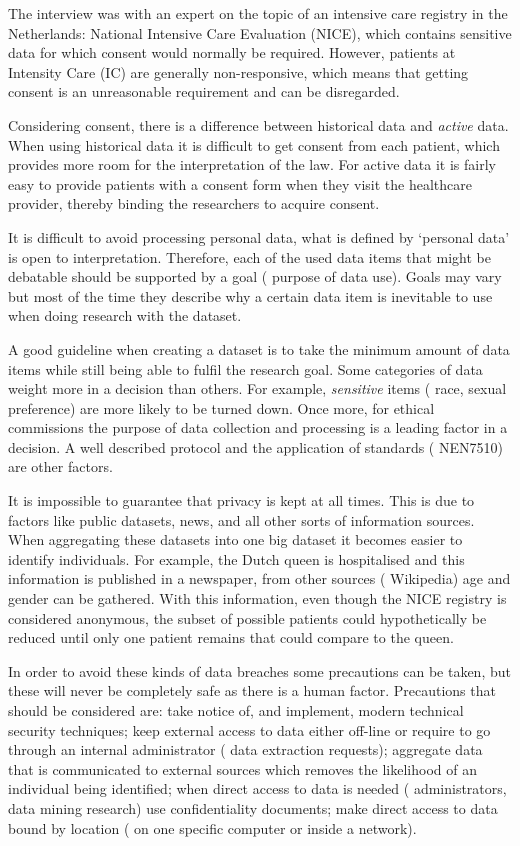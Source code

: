 The interview was with an expert on the topic of an intensive care registry in the Netherlands: National Intensive Care Evaluation (NICE), 
which contains sensitive data for which consent would normally be required. 
However, patients at Intensity Care (IC) are generally non-responsive, which means that getting consent is an unreasonable requirement and can be disregarded.

Considering consent, there is a difference between historical data and \emph{active} data.
When using historical data it is difficult to get consent from each patient, which provides more room for the interpretation of the law.
For active data it is fairly easy to provide patients with a consent form when they visit the healthcare provider, thereby binding the researchers to acquire consent. 

It is difficult to avoid processing personal data, \ie{} what is defined by `personal data' is open to interpretation.
Therefore, each of the used data items that might be debatable should be supported by a goal (\ie{} purpose of data use).
Goals may vary but most of the time they describe why a certain data item is inevitable to use when doing research with the dataset.

A good guideline when creating a dataset is to take the minimum amount of data items while still being able to fulfil the research goal.
Some categories of data weight more in a decision than others.
For example, \emph{sensitive} items (\eg{} race, sexual preference) are more likely to be turned down.
Once more, for ethical commissions the purpose of data collection and processing is a leading factor in a decision. 
A well described protocol and the application of standards (\eg{} NEN7510) are other factors.

It is impossible to guarantee that privacy is kept at all times.
This is due to factors like public datasets, news, and all other sorts of information sources.
When aggregating these datasets into one big dataset it becomes easier to identify individuals. 
For example, the Dutch queen is hospitalised and this information is published in a newspaper, from other sources (\eg{} Wikipedia) age and gender can be gathered.
With this information, even though the NICE registry is considered anonymous, the subset of possible patients could hypothetically be reduced until only one patient remains that could compare to the queen.

In order to avoid these kinds of data breaches some precautions can be taken, but these will never be completely safe as there is a human factor.
Precautions that should be considered are: take notice of, and implement, modern technical security techniques; keep external access to data either off-line or require to go through an internal administrator (\eg{} data extraction requests); aggregate data that is communicated to external sources which removes the likelihood of an individual being identified; when direct access to data is needed (\eg{} administrators, data mining research) use confidentiality documents; make direct access to data bound by location (\eg{} on one specific computer or inside a network).

